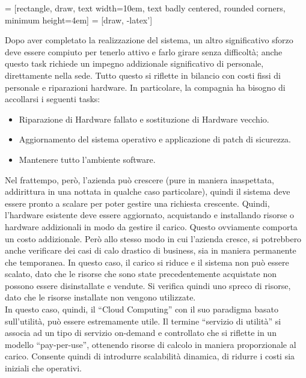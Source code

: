 \documentclass{article}
\begin{document}
\begin{center}
 = [rectangle, draw, 
    text width=10em, text badly centered, rounded corners, minimum height=4em]
 = [draw, -latex']
\end{center}
Dopo aver completato la realizzazione del sistema, un altro significativo sforzo deve essere compiuto per tenerlo attivo e farlo girare senza difficoltà; anche questo task richiede un impegno addizionale significativo di personale, direttamente nella sede. Tutto questo si riflette in bilancio con costi fissi di personale e riparazioni hardware. In particolare, la compagnia ha bisogno di accollarsi i seguenti tasks:
\begin{itemize}
    \item Riparazione di Hardware fallato e sostituzione di Hardware vecchio.
    \item Aggiornamento del sistema operativo e applicazione di patch di sicurezza.
    \item Mantenere tutto l’ambiente software.
\end{itemize}
Nel frattempo, però, l’azienda può crescere (pure in maniera inaspettata, addirittura in una nottata in qualche caso particolare), quindi il sistema deve essere pronto a scalare per poter gestire una richiesta crescente. Quindi, l’hardware esistente deve essere aggiornato, acquistando e installando risorse o hardware addizionali in modo da gestire il carico. Questo ovviamente comporta un costo addizionale. Però allo stesso modo in cui l’azienda cresce, si potrebbero anche verificare dei casi di calo drastico di business, sia in maniera permanente che temporanea. In questo caso, il carico si riduce e il sistema non può essere scalato, dato che le risorse che sono state precedentemente acquistate non possono essere disinstallate e vendute. Si verifica quindi uno spreco di risorse, dato che le risorse installate non vengono utilizzate.\\
In questo caso, quindi, il “Cloud Computing” con il suo paradigma basato sull’utilità, può essere estremamente utile. Il termine “servizio di utilità” si associa ad un tipo di servizio on-demand e controllato che si riflette in un modello “pay-per-use”, ottenendo risorse di calcolo in maniera proporzionale al carico. Consente quindi di introdurre scalabilità dinamica, di ridurre i costi sia iniziali che operativi.\\
\end{document}
